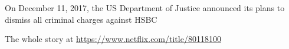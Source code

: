 On December 11, 2017, the US Department of Justice announced its plans to dismiss all criminal charges against HSBC

The whole story at \url{https://www.netflix.com/title/80118100}


